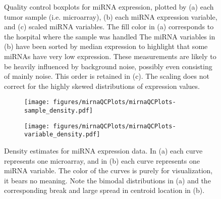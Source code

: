 \begin{figure}
	\centering
	\begin{subfigure}{1\textwidth}
		\centering
	\end{subfigure}
	\begin{subfigure}{1\textwidth}
		\centering
	\end{subfigure}
	\begin{subfigure}{1\textwidth}
		\centering
	\end{subfigure}

	\caption{Quality control boxplots for miRNA expression, plotted by
	(a) each tumor sample (i.e. microarray),
	(b) each miRNA expression variable, 
	and (c) scaled miRNA variables.
	The fill color in (a) corresponds to the hospital where the sample was handled
	The miRNA variables in (b) have been sorted by median expression to highlight that
	some miRNAs have very low expression. These measurements are likely to
	be heavily influenced by background noise, possibly even consisting of
	mainly noise. This order is retained in (c). The scaling does not
	correct for the highly skewed distributions of expression values.}
	\label{fig:qc-mirna-boxplot}
\end{figure}


\begin{figure}[!h]
	\centering
	\begin{subfigure}{.49\textwidth}
		\texttt{[image: figures/mirnaQCPlots/mirnaQCPlots-sample\_density.pdf]}
	\end{subfigure}%
	\begin{subfigure}{.49\textwidth}
		\texttt{[image: figures/mirnaQCPlots/mirnaQCPlots-variable\_density.pdf]}
	\end{subfigure}

	\caption{Density estimates for miRNA expression data. In (a) each curve represents one microarray,
	and in (b) each curve represents one miRNA variable. The color of the curves is purely for visualization,
	it bears no meaning. Note the bimodal distributions in (a) and the corresponding break
	and large spread in centroid location in (b).}
	\label{fig:qc-mirna-density}
\end{figure}
